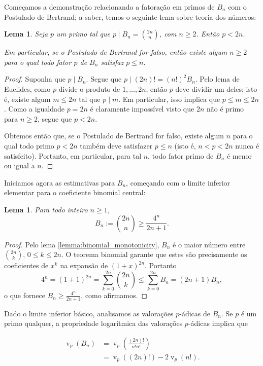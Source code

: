 \documentclass[11pt]{article}
\newtheorem{lemma}[theorem]{Lema}
\theoremstyle{remark}
\newcommand{\vs}{\vspace{10px}}
\DeclareMathOperator{\val}{v}
\begin{document}
Começamos a demonstração relacionando a fatoração em primos de $B_n$ com o Postulado de Bertrand; a saber, temos o seguinte lema sobre teoria dos números:
\begin{lemma} \label{lemma:prime_factors_are_less_than_two_n}
    Seja $p$ um primo tal que $p\mid B_n= \binom{2n}{n}$, com $n\ge 2$. Então $p < 2n$.

    Em particular, se o Postulado de Bertrand for falso, então existe algum $n\ge 2$ para o qual todo fator $p$ de $B_n$ satisfaz $p\le n$.
\end{lemma}
\begin{proof}
    Suponha que $p\mid B_n$. Segue que $p\mid (2n)! = (n!)^2B_n$. Pelo lema de Euclides, como $p$ divide o produto de $1,\ldots, 2n$, então $p$ deve dividir um deles; isto é, existe algum $m\le 2n$ tal que $p\mid m$. Em particular, isso implica que $p\le m\le 2n$. Como a igualdade $p=2n$ é claramente impossível visto que $2n$ não é primo para $n\ge 2$, segue que $p<2n$.
    
    Obtemos então que, se o Postulado de Bertrand for falso, existe algum $n$ para o qual todo primo $p<2n$ também deve satisfazer $p\le n$ (isto é, $n<p<2n$ nunca é satisfeito). Portanto, em particular, para tal $n$, todo fator primo de $B_n$ é menor ou igual a $n$.
\end{proof}\vs


Iniciamos agora as estimativas para $B_n$, começando com o limite inferior elementar para o coeficiente binomial central:

\begin{lemma} \label{lemma:lower_bound_bn}
Para todo inteiro $n\geq 1$,
\[
B_n:=\binom{2n}{n}\geq \frac{4^n}{2n+1}.
\]
\end{lemma}

\begin{proof}
Pelo lema \ref{lemma:binomial_monotonicity}, $B_n$ é o maior número entre $\binom{2n}{k}$, $0\le k\le 2n$. O teorema binomial garante que estes são precisamente os coeficientes de $x^k$ na expansão de $(1+x)^{2n}$. Portanto
\[
4^n
=(1+1)^{2n}
=\sum_{k=0}^{2n}\binom{2n}{k}
\leq \sum_{k=0}^{2n}B_n = (2n+1)B_n,
\]
o que fornece $B_n\ge \frac{4^n}{2n+1}$, como afirmamos.
\end{proof}
\vs

Dado o limite inferior básico, analisamos as valorações $p$-ádicas de $B_n$. Se $p$ é um primo qualquer, a propriedade logarítmica das valorações $p$-ádicas implica que

\begin{align*}
    \val_p(B_n)&=\val_p\left(\frac{(2n)!}{n!n!}\right)\\
    &=\val_p((2n)!)-2\val_p(n!).
\end{align*}
\end{document}
